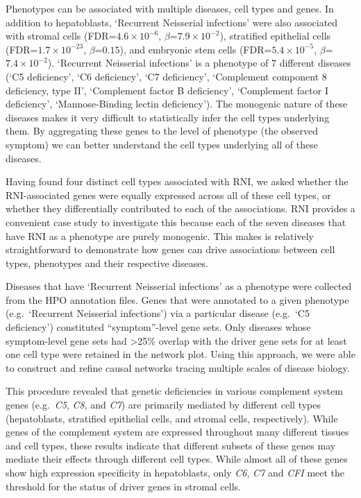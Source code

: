 \documentclass[
]{article}
\begin{document}
Phenotypes can be associated with multiple diseases, cell types and
genes. In addition to hepatoblasts, `Recurrent Neisserial infections'
were also associated with stromal cells (FDR=\(4.6 \times 10^{-6}\),
\(\beta\)=\(7.9 \times 10^{-2}\)), stratified epithelial cells
(FDR=\(1.7 \times 10^{-23}\), \(\beta\)=\(0.15\)), and embryonic stem
cells (FDR=\(5.4 \times 10^{-5}\), \(\beta\)=\(7.4 \times 10^{-2}\)).
`Recurrent Neisserial infections' is a phenotype of 7 different diseases
(`C5 deficiency', `C6 deficiency', `C7 deficiency', `Complement
component 8 deficiency, type II', `Complement factor B deficiency',
`Complement factor I deficiency', `Mannose-Binding lectin deficiency').
The monogenic nature of these diseases makes it very difficult to
statistically infer the cell types underlying them. By aggregating these
genes to the level of phenotype (the observed symptom) we can better
understand the cell types underlying all of these diseases.

Having found four distinct cell types associated with RNI, we asked
whether the RNI-associated genes were equally expressed across all of
these cell types, or whether they differentially contributed to each of
the associations. RNI provides a convenient case study to investigate
this because each of the seven diseases that have RNI as a phenotype are
purely monogenic. This makes is relatively straightforward to
demonstrate how genes can drive associations between cell types,
phenotypes and their respective diseases.

Diseases that have `Recurrent Neisserial infections' as a phenotype were
collected from the HPO annotation files. Genes that were annotated to a
given phenotype (e.g.~`Recurrent Neisserial infections') via a
particular disease (e.g.~`C5 deficiency') constituted ``symptom''-level
gene sets. Only diseases whose symptom-level gene sets had
\textgreater25\% overlap with the driver gene sets for at least one cell
type were retained in the network plot. Using this approach, we were
able to construct and refine causal networks tracing multiple scales of
disease biology.

This procedure revealed that genetic deficiencies in various complement
system genes (e.g.~\emph{C5}, \emph{C8}, and \emph{C7}) are primarily
mediated by different cell types (hepatoblasts, stratified epithelial
cells, and stromal cells, respectively). While genes of the complement
system are expressed throughout many different tissues and cell types,
these results indicate that different subsets of these genes may mediate
their effects through different cell types. While almost all of these
genes show high expression specificity in hepatoblasts, only \emph{C6},
\emph{C7} and \emph{CFI} meet the threshold for the status of driver
genes in stromal cells.
\end{document}
